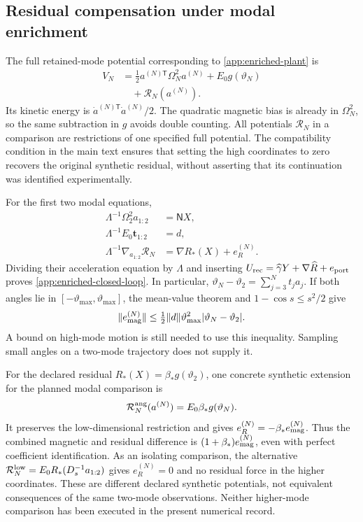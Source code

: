 \subsection{Residual compensation under modal enrichment}
\label{sm:enriched}
The full retained-mode potential corresponding to
\eqref{app:enriched-plant} is
\begin{align}
 V_N&=\tfrac12a^{(N)\mathsf T}\Omega_N^2a^{(N)}
       +E_0g(\vartheta_N)\nonumber\\
 &\quad+\mathcal R_N(a^{(N)}).
 \label{sm:enriched-potential}
\end{align}
Its kinetic energy is $\dot a^{(N)\mathsf T}\dot a^{(N)}/2$.
The quadratic magnetic bias is already in $\Omega_N^2$, so the same
subtraction in $g$ avoids double counting. All potentials
$\mathcal R_N$ in a comparison are restrictions of one specified
full potential. The compatibility condition in the main text ensures
that setting the high coordinates to zero recovers the original
synthetic residual, without asserting that its continuation was
identified experimentally.

For the first two modal equations,
\begin{align}
 \Lambda^{-1}\Omega_2^2a_{1:2}&=\mathsf N X,\nonumber\\
 \Lambda^{-1}E_0\boldsymbol t_{1:2}&=d,\nonumber\\
 \Lambda^{-1}\nabla_{a_{1:2}}\mathcal R_N
 &=\nabla R_*(X)+e_R^{(N)}.
 \label{sm:enriched-projection}
\end{align}
Dividing their acceleration equation by $\Lambda$ and inserting
$U_{\rm rec}=\widehat\gamma Y+\nabla\widehat R+e_{\rm port}$
proves \eqref{app:enriched-closed-loop}. In particular,
$\vartheta_N-\vartheta_2=\sum_{j=3}^Nt_ja_j$.
If both angles lie in $[-\vartheta_{\max},\vartheta_{\max}]$, the
mean-value theorem and $1-\cos s\le s^2/2$ give
\begin{equation}
 \|e_{\rm mag}^{(N)}\|
 \le\tfrac12\|d\|\vartheta_{\max}^2
                   |\vartheta_N-\vartheta_2|.
 \label{sm:angle-defect-bound}
\end{equation}
A bound on high-mode motion is still needed to use this inequality.
Sampling small angles on a two-mode trajectory does not supply it.

For the declared residual $R_*(X)=\beta_*g(\vartheta_2)$, one concrete
synthetic extension for the planned modal comparison is
\begin{equation}
 \mathcal R_N^{\rm ang}(a^{(N)})=E_0\beta_*g(\vartheta_N).
 \label{sm:angle-residual-extension}
\end{equation}
It preserves the low-dimensional restriction and gives
$e_R^{(N)}=-\beta_*e_{\rm mag}^{(N)}$. Thus the combined magnetic
and residual difference is $(1+\beta_*)e_{\rm mag}^{(N)}$, even with
perfect coefficient identification. As an isolating comparison, the
alternative
$\mathcal R_N^{\rm low}=E_0R_*(D_s^{-1}a_{1:2})$ gives
$e_R^{(N)}=0$ and no residual force in the higher coordinates.
These are different declared synthetic potentials, not equivalent
consequences of the same two-mode observations. Neither higher-mode
comparison has been executed in the present numerical record.

